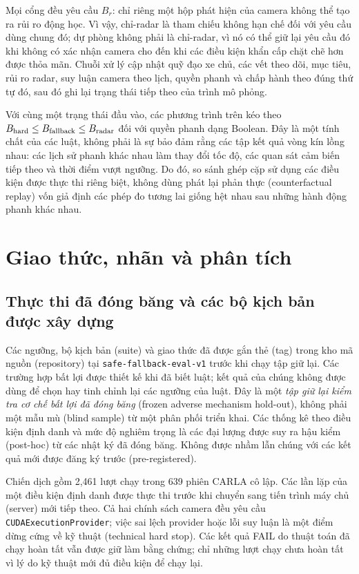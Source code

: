 \documentclass[11pt,a4paper]{article}
\begin{document}
Mọi cổng đều yêu cầu $B_r$: chỉ riêng một hộp phát hiện của camera không thể
tạo ra rủi ro động học. Vì vậy, chỉ-radar là tham chiếu không hạn chế đối với
yêu cầu dùng chung đó; dự phòng không phải là chỉ-radar, vì nó có thể giữ lại
yêu cầu đó khi không có xác nhận camera cho đến khi các điều kiện khẩn cấp
chặt chẽ hơn được thỏa mãn. Chuỗi xử lý cập nhật quỹ đạo xe chủ, các vết theo
dõi, mục tiêu, rủi ro radar, suy luận camera theo lịch, quyền phanh và chấp
hành theo đúng thứ tự đó, sau đó ghi lại trạng thái tiếp theo của trình mô
phỏng.

Với cùng một trạng thái đầu vào, các phương trình trên kéo theo
$B_{\rm hard}\leq B_{\rm fallback}\leq B_{\rm radar}$ đối với quyền phanh dạng
Boolean. Đây là một tính chất của các luật, không phải là sự bảo đảm rằng các
tập kết quả vòng kín lồng nhau: các lịch sử phanh khác nhau làm thay đổi tốc
độ, các quan sát cảm biến tiếp theo và thời điểm vượt ngưỡng. Do đó, so sánh
ghép cặp sử dụng các điều kiện được thực thi riêng biệt, không dùng phát lại
phản thực (counterfactual replay) vốn giả định các phép đo tương lai giống hệt
nhau sau những hành động phanh khác nhau.

\section{Giao thức, nhãn và phân tích}
\subsection{Thực thi đã đóng băng và các bộ kịch bản được xây dựng}
Các ngưỡng, bộ kịch bản (suite) và giao thức đã được gắn thẻ (tag) trong kho
mã nguồn (repository) tại \texttt{safe-fallback-eval-v1} trước khi chạy tập
giữ lại. Các trường hợp bất lợi được thiết kế khi đã biết luật; kết quả của
chúng không được dùng để chọn hay tinh chỉnh lại các ngưỡng của luật. Đây là
một \emph{tập giữ lại kiểm tra cơ chế bất lợi đã đóng băng} (frozen adverse
mechanism hold-out), không phải một mẫu mù (blind sample) từ một phân phối
triển khai. Các thống kê theo điều kiện định danh và mức độ nghiêm trọng là
các đại lượng được suy ra hậu kiểm (post-hoc) từ các nhật ký đã đóng băng.
Không được nhầm lẫn chúng với các kết quả mới được đăng ký trước
(pre-registered).

Chiến dịch gồm 2,461 lượt chạy trong 639 phiên CARLA cô lập. Các lần lặp của
một điều kiện định danh được thực thi trước khi chuyển sang tiến trình máy
chủ (server) mới tiếp theo. Cả hai chính sách camera đều yêu cầu
\texttt{CUDAExecutionProvider}; việc sai lệch provider hoặc lỗi suy luận là
một điểm dừng cứng về kỹ thuật (technical hard stop). Các kết quả FAIL do
thuật toán đã chạy hoàn tất vẫn được giữ làm bằng chứng; chỉ những lượt chạy
chưa hoàn tất vì lý do kỹ thuật mới đủ điều kiện để chạy lại.
\end{document}
